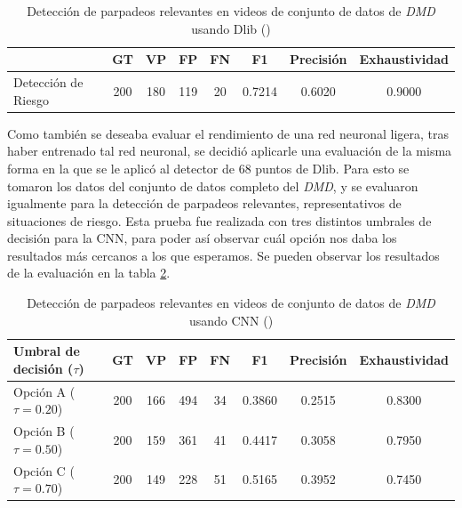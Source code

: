 \begin{table}[h!]
    \centering
    \footnotesize
    \renewcommand{\arraystretch}{1.8}
    \begin{tabularx}{\textwidth}{X c c c c c c c}
        \toprule
        & \textbf{GT} & \textbf{VP} & \textbf{FP} & \textbf{FN} & \textbf{F1} & \textbf{Precisión} & \textbf{Exhaustividad} \\
        \midrule
        Detección de Riesgo & 200 & 180 & 119 & 20 & 0.7214 & 0.6020 & 0.9000 \\
        \bottomrule
    \end{tabularx}
    \caption{Detección de parpadeos relevantes en videos de conjunto de datos de \textit{DMD} usando Dlib (\cite{DMD})}
    \label{tab:blinkDMD_relevant}
\end{table}

Como también se deseaba evaluar el rendimiento de una red neuronal ligera, tras haber entrenado tal red neuronal, se decidió aplicarle una evaluación de la misma forma en la que se le aplicó al detector de 68 puntos de Dlib. Para esto se tomaron los datos del conjunto de datos completo del \textit{DMD}, y se evaluaron igualmente para la detección de parpadeos relevantes, representativos de situaciones de riesgo. Esta prueba fue realizada con tres distintos umbrales de decisión para la CNN, para poder así observar cuál opción nos daba los resultados más cercanos a los que esperamos. Se pueden observar los resultados de la evaluación en la tabla \ref{tab:blinkCNN}.

\begin{table}[h!]
    \centering
    \footnotesize
    \renewcommand{\arraystretch}{1.8}
    \begin{tabularx}{\textwidth}{X c c c c c c c}
        \toprule
        \textbf{Umbral de decisión ($\tau$)} & \textbf{GT} & \textbf{VP} & \textbf{FP} & \textbf{FN} & \textbf{F1} & \textbf{Precisión} & \textbf{Exhaustividad} \\
        \midrule
        Opción A ($\tau = 0.20$) & 200 & 166 & 494 & 34 & 0.3860 & 0.2515 & 0.8300 \\
        Opción B ($\tau = 0.50$) & 200 & 159 & 361 & 41 & 0.4417 & 0.3058 & 0.7950 \\
        Opción C ($\tau = 0.70$) & 200 & 149 & 228 & 51 & 0.5165 & 0.3952 & 0.7450 \\
        \bottomrule
    \end{tabularx}
    \caption{Detección de parpadeos relevantes en videos de conjunto de datos de \textit{DMD} usando CNN (\cite{DMD})}
    \label{tab:blinkCNN}
\end{table}

